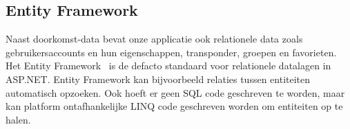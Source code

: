 \subsection{Entity Framework}
Naast doorkomst-data bevat onze applicatie ook relationele data zoals gebruikersaccounts en hun eigenschappen, transponder, groepen en favorieten. Het Entity Framework~\cite{entityframework-msdn, entityframework-facto} is de defacto standaard voor relationele datalagen in ASP.NET. Entity Framework kan bijvoorbeeld relaties tussen entiteiten automatisch opzoeken. Ook hoeft er geen SQL code geschreven te worden, maar kan platform ontafhankelijke LINQ code geschreven worden om entiteiten op te halen.